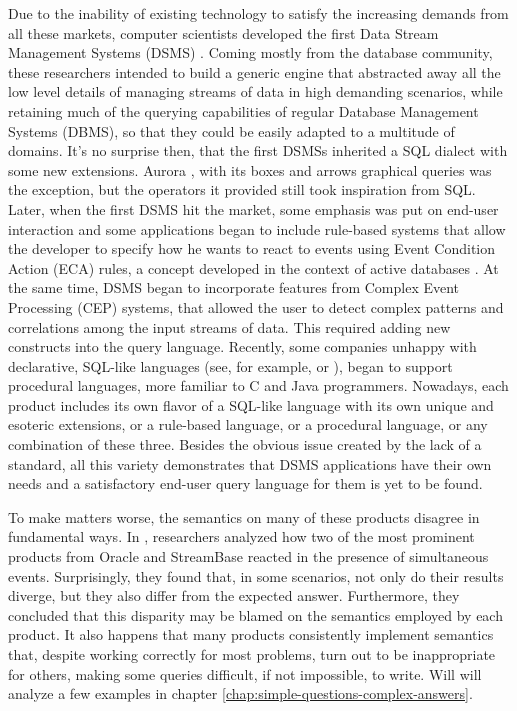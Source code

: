 \documentclass[a4,11pt]{report}
\begin{document}
Due to the inability of existing technology to satisfy the increasing
demands from all these markets, computer scientists developed the
first Data Stream Management Systems (DSMS) \cite{stream}
\cite{aurora} \cite{telegraphcq}. Coming mostly from the database
community, these researchers intended to build a generic engine that
abstracted away all the low level details of managing streams of data
in high demanding scenarios, while retaining much of the querying
capabilities of regular Database Management Systems (DBMS), so that
they could be easily adapted to a multitude of domains. It's no
surprise then, that the first DSMSs inherited a SQL dialect with some
new extensions. Aurora \cite{aurora}, with its boxes and arrows
graphical queries was the exception, but the operators it provided
still took inspiration from SQL. Later, when the first DSMS hit the
market, some emphasis was put on end-user interaction and some
applications began to include rule-based systems that allow the
developer to specify how he wants to react to events using Event
Condition Action (ECA) rules, a concept developed in the context of
active databases \cite{adbms-manifesto}. At the same time, DSMS began
to incorporate features from Complex Event Processing (CEP) systems,
that allowed the user to detect complex patterns and correlations
among the input streams of data. This required adding new constructs
into the query language. Recently, some companies unhappy with
declarative, SQL-like languages (see, for example,
\cite{sql-impendance-mismatch:post} or \cite{flexstreams-whitepaper}),
began to support procedural languages, more familiar to C and Java
programmers. Nowadays, each product includes its own flavor of a
SQL-like language with its own unique and esoteric extensions, or a
rule-based language, or a procedural language, or any combination of
these three. Besides the obvious issue created by the lack of a
standard, all this variety demonstrates that DSMS applications have
their own needs and a satisfactory end-user query language for them is
yet to be found.

To make matters worse, the semantics on many of these products
disagree in fundamental ways. In \cite{towards_stream_sql_standard},
researchers analyzed how two of the most prominent products from
Oracle and StreamBase reacted in the presence of simultaneous
events. Surprisingly, they found that, in some scenarios, not only do
their results diverge, but they also differ from the expected
answer. Furthermore, they concluded that this disparity may be blamed
on the semantics employed by each product. It also happens that many
products consistently implement semantics that, despite working
correctly for most problems, turn out to be inappropriate for others,
making some queries difficult, if not impossible, to write. Will will
analyze a few examples in chapter
\ref{chap:simple-questions-complex-answers}.
\end{document}
